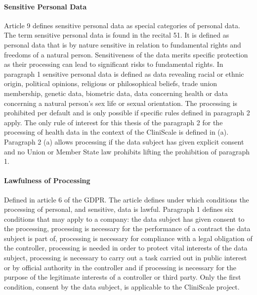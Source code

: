 \paragraph{Sensitive Personal Data} Article 9 defines sensitive personal data as special categories of personal data. The term sensitive personal data is found in the recital 51. It is defined as personal data that is by nature sensitive in relation to fundamental rights and freedoms of a natural person. Sensitiveness of the data merits specific protection as their processing can lead to significant risks to fundamental rights. In paragraph 1 sensitive personal data is defined as data revealing racial or ethnic origin, political opinions, religious or philosophical beliefs, trade union membership, genetic data, biometric data, data concerning health or data concerning a natural person's sex life or sexual orientation. The processing is prohibited per default and is only possible if specific rules defined in paragraph 2 apply. The only rule of interest for this thesis of the paragraph 2 for the processing of health data in the context of the CliniScale is defined in (a). Paragraph 2 (a) allows processing if the data subject has given explicit consent and no Union or Member State law prohibits lifting the prohibition of paragraph 1.\cite{GDPR9}\cite{GDPRrec51}

\paragraph{Lawfulness of Processing} Defined in article 6 of the GDPR. The article defines under which conditions the processing of personal, and sensitive, data is lawful. Paragraph 1 defines six conditions that may apply to a company: the data subject has given consent to the processing, processing is necessary for the performance of a contract the data subject is part of, processing is necessary for compliance with a legal obligation of the controller, processing is needed in order to protect vital interests of the data subject, processing is necessary to carry out a task carried out in public interest or by official authority in the controller and if processing is necessary for the purpose of the legitimate interests of a controller or third party. Only the first condition, consent by the data subject, is applicable to the CliniScale project.\cite{GDPR6}


